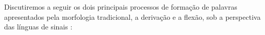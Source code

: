 

Discutiremos a seguir os dois principais processos de formação de palavras apresentados pela morfologia tradicional, a derivação e a flexão, sob a perspectiva das línguas de sinais \cite{quadros-2004-estudos-linguisticos,hill-2019-sign-languages,klima-1979-signs-of-language}:

